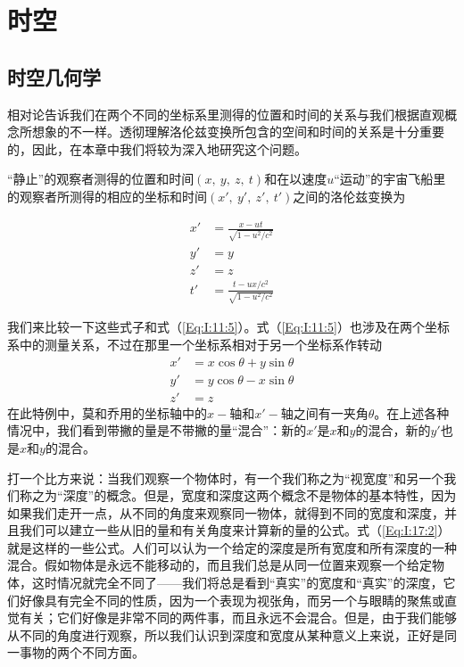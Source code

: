 \chapter{时空}

\section{时空几何学}

相对论告诉我们在两个不同的坐标系里测得的位置和时间的关系与我们根据直观概念所想象的不一样。透彻理解洛伦兹变换所包含的空间和时间的关系是十分重要的，因此，在本章中我们将较为深入地研究这个问题。

“静止”的观察者测得的位置和时间$(x,~y,~z,~t)$和在以速度$u$“运动”的宇宙飞船里的观察者所测得的相应的坐标和时间$(x',~y',~z',~t')$之间的洛伦兹变换为

\begin{equation}
    \label{Eq:I:17:1}
    \begin{aligned}
        x'&=\frac{x-ut}{\sqrt{1-u^2/c^2}} \\
        y'&=y \\
        z'&=z \\
        t'&=\frac{t-ux/c^2}{\sqrt{1-u^2/c^2}}
    \end{aligned}
\end{equation}

我们来比较一下这些式子和式（\ref{Eq:I:11:5}）。式（\ref{Eq:I:11:5}）也涉及在两个坐标系中的测量关系，不过在那里一个坐标系相对于另一个坐标系作转动
\begin{equation}
    \label{Eq:I:17:2}
    \begin{aligned}
        x'&=x\cos\theta + y\sin \theta \\
        y'&=y\cos\theta - x\sin \theta \\
        z'&=z 
    \end{aligned}
\end{equation}
在此特例中，莫和乔用的坐标轴中的$x-$轴和$x'-$轴之间有一夹角$\theta$。在上述各种情况中，我们看到带撇的量是不带撇的量“混合”：新的$x'$是$x$和$y$的混合，新的$y'$也是$x$和$y$的混合。

打一个比方来说：当我们观察一个物体时，有一个我们称之为“视宽度”和另一个我们称之为“深度”的概念。但是，宽度和深度这两个概念不是物体的基本特性，因为如果我们走开一点，从不同的角度来观察同一物体，就得到不同的宽度和深度，并且我们可以建立一些从旧的量和有关角度来计算新的量的公式。式（\ref{Eq:I:17:2}）就是这样的一些公式。人们可以认为一个给定的深度是所有宽度和所有深度的一种混合。假如物体是永远不能移动的，而且我们总是从同一位置来观察一个给定物体，这时情况就完全不同了——我们将总是看到“真实”的宽度和“真实”的深度，它们好像具有完全不同的性质，因为一个表现为视张角，而另一个与眼睛的聚焦或直觉有关；它们好像是非常不同的两件事，而且永远不会混合。但是，由于我们能够从不同的角度进行观察，所以我们认识到深度和宽度从某种意义上来说，正好是同一事物的两个不同方面。


